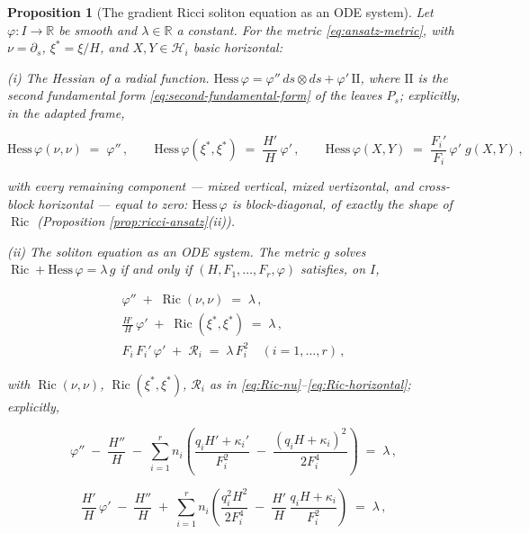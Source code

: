 \documentclass[11pt]{amsart}
\theoremstyle{plain}
\numberwithin{equation}{section}
\newtheorem{proposition}[theorem]{Proposition}
\theoremstyle{definition}
\theoremstyle{remark}
\begin{document}
\iffalse
\begin{proposition}[The gradient Ricci soliton equation as an ODE system]\label{prop:soliton-ode}
	Let $\varphi : I \to \mathbb{R}$ be smooth and $\lambda \in \mathbb{R}$ a constant. For the metric \eqref{eq:ansatz-metric}, with $\nu = \partial_s$, $\xi^* = \xi/H$, and $X, Y \in \mathcal{H}_i$ basic horizontal:
	
	\emph{(i) The Hessian of a radial function.} $\mathrm{Hess}\,\varphi = \varphi''\, ds \otimes ds + \varphi'\, \mathrm{II}$, where $\mathrm{II}$ is the second fundamental form \eqref{eq:second-fundamental-form} of the leaves $P_s$; explicitly, in the adapted frame,
	
	\[
	\mathrm{Hess}\,\varphi(\nu, \nu) \;=\; \varphi'' \,, \qquad \mathrm{Hess}\,\varphi(\xi^*, \xi^*) \;=\; \frac{H'}{H}\, \varphi' \,, \qquad \mathrm{Hess}\,\varphi(X, Y) \;=\; \frac{F_i'}{F_i}\, \varphi'\; g(X, Y) \,,
	\]
	
	with every remaining component --- mixed vertical, mixed vertizontal, and cross-block horizontal --- equal to zero: $\mathrm{Hess}\,\varphi$ is block-diagonal, of exactly the shape of $\operatorname{Ric}$ (Proposition \ref{prop:ricci-ansatz}(ii)).
	
	\emph{(ii) The soliton equation as an ODE system.} The metric $g$ solves $\operatorname{Ric} + \mathrm{Hess}\,\varphi = \lambda\, g$ if and only if $( H, F_1, \dots, F_r, \varphi )$ satisfies, on $I$,
	
	\begin{equation*}
		\begin{gathered}
			\varphi'' \;+\; \operatorname{Ric}(\nu, \nu) \;=\; \lambda \,, \\
			\frac{H'}{H}\, \varphi' \;+\; \operatorname{Ric}(\xi^*, \xi^*) \;=\; \lambda \,, \\
			F_i\, F_i'\, \varphi' \;+\; \mathcal{R}_i \;=\; \lambda\, F_i^2 \quad ( i = 1, \dots, r ) \,,
		\end{gathered}
	\end{equation*}
	
	with $\operatorname{Ric}(\nu, \nu)$, $\operatorname{Ric}(\xi^*, \xi^*)$, $\mathcal{R}_i$ as in \eqref{eq:Ric-nu}--\eqref{eq:Ric-horizontal}; explicitly,
	
	\[
	\varphi'' \;-\; \frac{H''}{H} \;-\; \sum_{i=1}^r n_i \left( \frac{q_i H' + \kappa_i'}{F_i^2} \;-\; \frac{(q_i H + \kappa_i)^2}{2 F_i^4} \right) \;=\; \lambda \,,
	\]
	
	\[
	\frac{H'}{H}\, \varphi' \;-\; \frac{H''}{H} \;+\; \sum_{i=1}^r n_i \left( \frac{q_i^2 H^2}{2 F_i^4} \;-\; \frac{H'}{H}\, \frac{q_i H + \kappa_i}{F_i^2} \right) \;=\; \lambda \,,
	\]
	

\end{proposition}
\end{document}
